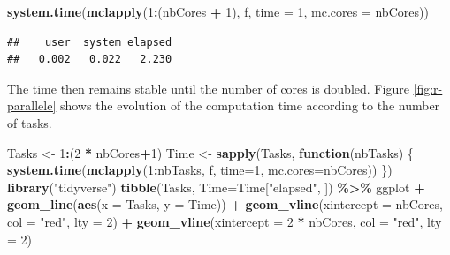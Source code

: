 \documentclass[
  12pt,
  american,
  a4paper,
  extrafontsizes,onecolumn,openright
  ]{memoir}
\newenvironment{Shaded}{\begin{snugshade}}{\end{snugshade}}
\newcommand{\AttributeTok}[1]{\textcolor[rgb]{0.13,0.29,0.53}{#1}}
\newcommand{\ControlFlowTok}[1]{\textcolor[rgb]{0.13,0.29,0.53}{\textbf{#1}}}
\newcommand{\DecValTok}[1]{\textcolor[rgb]{0.00,0.00,0.81}{#1}}
\newcommand{\FunctionTok}[1]{\textcolor[rgb]{0.13,0.29,0.53}{\textbf{#1}}}
\newcommand{\NormalTok}[1]{#1}
\newcommand{\OtherTok}[1]{\textcolor[rgb]{0.56,0.35,0.01}{#1}}
\newcommand{\SpecialCharTok}[1]{\textcolor[rgb]{0.81,0.36,0.00}{\textbf{#1}}}
\newcommand{\StringTok}[1]{\textcolor[rgb]{0.31,0.60,0.02}{#1}}
\begin{document}
\begin{Shaded}
\begin{Highlighting}[]
\FunctionTok{system.time}\NormalTok{(}\FunctionTok{mclapply}\NormalTok{(}\DecValTok{1}\SpecialCharTok{:}\NormalTok{(nbCores }\SpecialCharTok{+} \DecValTok{1}\NormalTok{), f, }\AttributeTok{time =} \DecValTok{1}\NormalTok{, }\AttributeTok{mc.cores =}\NormalTok{ nbCores))}
\end{Highlighting}
\end{Shaded}

\begin{verbatim}
##    user  system elapsed 
##   0.002   0.022   2.230
\end{verbatim}

\normalsize

The time then remains stable until the number of cores is doubled.
Figure \ref{fig:r-parallele} shows the evolution of the computation time according to the number of tasks.



\scriptsize

\begin{Shaded}
\begin{Highlighting}[]
\NormalTok{Tasks }\OtherTok{\textless{}{-}} \DecValTok{1}\SpecialCharTok{:}\NormalTok{(}\DecValTok{2} \SpecialCharTok{*}\NormalTok{ nbCores}\SpecialCharTok{+}\DecValTok{1}\NormalTok{)}
\NormalTok{Time }\OtherTok{\textless{}{-}} \FunctionTok{sapply}\NormalTok{(Tasks, }\ControlFlowTok{function}\NormalTok{(nbTasks) \{}
      \FunctionTok{system.time}\NormalTok{(}\FunctionTok{mclapply}\NormalTok{(}\DecValTok{1}\SpecialCharTok{:}\NormalTok{nbTasks, f, }\AttributeTok{time=}\DecValTok{1}\NormalTok{, }\AttributeTok{mc.cores=}\NormalTok{nbCores))}
\NormalTok{              \})}
\FunctionTok{library}\NormalTok{(}\StringTok{"tidyverse"}\NormalTok{)}
\FunctionTok{tibble}\NormalTok{(Tasks, }\AttributeTok{Time=}\NormalTok{Time[}\StringTok{"elapsed"}\NormalTok{, ]) }\SpecialCharTok{\%\textgreater{}\%} 
\NormalTok{  ggplot }\SpecialCharTok{+}
  \FunctionTok{geom\_line}\NormalTok{(}\FunctionTok{aes}\NormalTok{(}\AttributeTok{x =}\NormalTok{ Tasks, }\AttributeTok{y =}\NormalTok{ Time)) }\SpecialCharTok{+}
  \FunctionTok{geom\_vline}\NormalTok{(}\AttributeTok{xintercept =}\NormalTok{ nbCores, }\AttributeTok{col =} \StringTok{"red"}\NormalTok{, }\AttributeTok{lty =} \DecValTok{2}\NormalTok{) }\SpecialCharTok{+}
  \FunctionTok{geom\_vline}\NormalTok{(}\AttributeTok{xintercept =} \DecValTok{2} \SpecialCharTok{*}\NormalTok{ nbCores, }\AttributeTok{col =} \StringTok{"red"}\NormalTok{, }\AttributeTok{lty =} \DecValTok{2}\NormalTok{)}
\end{Highlighting}
\end{Shaded}
\end{document}
